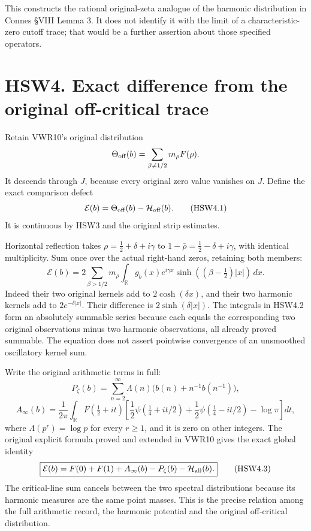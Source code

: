 This constructs the rational original-zeta analogue of the harmonic
distribution in Connes §VIII Lemma 3. It does not identify it with the
limit of a characteristic-zero cutoff trace; that would be a further
assertion about those specified operators.

\section{HSW4. Exact difference from the original off-critical
trace}\label{hsw4.-exact-difference-from-the-original-off-critical-trace}

Retain VWR10's original distribution \[
\Theta_{\rm off}(b)=\sum_{\beta\ne1/2}m_\rho F(\rho).
\] It descends through \(J\), because every original zero value vanishes
on \(J\). Define the exact comparison defect \[
\mathcal E(b)=\Theta_{\rm off}(b)-\mathcal H_{\rm off}(b).
\tag{HSW4.1}
\] It is continuous by HSW3 and the original strip estimates.

Horizontal reflection takes \(\rho=\tfrac12+\delta+i\gamma\) to
\(1-\bar\rho=\tfrac12-\delta+i\gamma\), with identical multiplicity. Sum
once over the actual right-hand zeros, retaining both members: \[
\boxed{\mathcal E(b)=
2\sum_{\beta>1/2}m_\rho
\int_{\mathbb R}g_b(x)e^{i\gamma x}
\sinh((\beta-\tfrac12)|x|)\,dx.}
\tag{HSW4.2}
\] Indeed their two original kernels add to \(2\cosh(\delta x)\), and
their two harmonic kernels add to \(2e^{-\delta|x|}\). Their difference
is \(2\sinh(\delta|x|)\). The integrals in HSW4.2 form an absolutely
summable series because each equals the corresponding two original
observations minus two harmonic observations, all already proved
summable. The equation does not assert pointwise convergence of an
unsmoothed oscillatory kernel sum.

Write the original arithmetic terms in full: \[
P_\zeta(b)=\sum_{n=2}^\infty\Lambda(n)
\bigl(b(n)+n^{-1}b(n^{-1})\bigr),
\] \[
A_\infty(b)=\frac1{2\pi}\int_{\mathbb R}F(\tfrac12+it)
\left[
\frac12\psi(\tfrac14+it/2)+\frac12\psi(\tfrac14-it/2)-\log\pi
\right]dt,
\] where \(\Lambda(p^r)=\log p\) for every \(r\ge1\), and it is zero on
other integers. The original explicit formula proved and extended in
VWR10 gives the exact global identity \[
\boxed{\mathcal E(b)
=F(0)+F(1)+A_\infty(b)-P_\zeta(b)-\mathcal H_{\rm all}(b).}
\tag{HSW4.3}
\] The critical-line sum cancels between the two spectral distributions
because its harmonic measures are the same point masses. This is the
precise relation among the full arithmetic record, the harmonic
potential and the original off-critical distribution.

